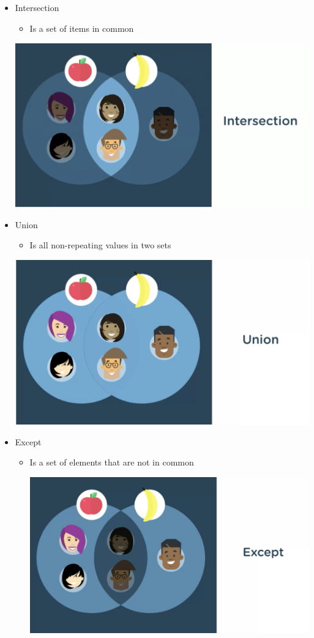 \documentclass[12pt]{article}
\begin{document}
\begin{itemize}
    \item Intersection
    \begin{itemize}
        \item Is a set of items in common
    \end{itemize}

    \begin{center}
    \includegraphics[width=0.8\linewidth]{images/part_1_notes_2.png}
    \end{center}

    \item Union
    \begin{itemize}
        \item Is all non-repeating values in two sets
    \end{itemize}

    \begin{center}
    \includegraphics[width=0.8\linewidth]{images/part_1_notes_3.png}
    \end{center}

    \item Except
    \begin{itemize}
        \item Is a set of elements that are not in common

    \begin{center}
    \includegraphics[width=0.8\linewidth]{images/part_1_notes_4.png}
    \end{center}

    \end{itemize}
\end{itemize}
\end{document}
